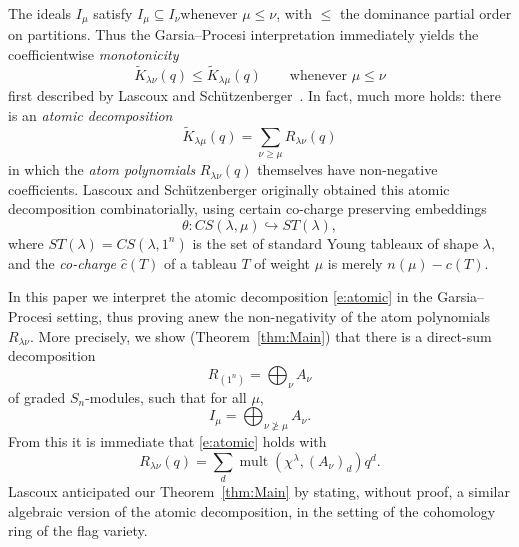 \documentclass[12pt]{article}
\newcommand{\KK}{\tilde{K}}
\newcommand{\charge}{c}
\newcommand{\cocharge}{\hat{c}}
\newcommand{\chg}{\charge}
\newcommand{\ccg}{\cocharge}
\newcommand{\LS}{Lascoux and Sch\"{u}tzenberger}
\newcommand{\mult}{\operatorname{mult}}
\numberwithin{equation}{section}
\theoremstyle{plain}
\theoremstyle{definition}
\theoremstyle{remark}
\begin{document}
The ideals $I_{\mu }$ satisfy
$I_{\mu }\subseteq I_{\nu } %
\text{whenever }\mu \leq \nu$,
with $\leq$ the dominance partial order on partitions.  Thus
the Garsia--Procesi interpretation immediately yields the
coefficientwise {\it monotonicity}
\begin{equation}\label{e:monotonicity}
\KK _{\lambda \nu }(q) \leq \KK _{\lambda \mu }(q) \qquad
\text{whenever }\mu \leq \nu 
\end{equation}
first described by \LS\ \cite{L&S:Plaxique}.
In fact, much more holds: there is an {\it atomic decomposition}
\begin{equation}\label{e:atomic}
\KK _{\lambda \mu }(q) = \sum _{\nu \geq \mu } R_{\lambda \nu }(q)
\end{equation}
in which the {\it atom polynomials} $R_{\lambda \nu }(q)$ themselves
have non-negative coefficients.  Lascoux and Sch\"utzenberger
\cite{L&S:Plaxique,Lascoux} originally obtained this atomic
decomposition combinatorially, using certain co-charge preserving
embeddings
\begin{equation}\label{e:embedding}
\theta \colon CS(\lambda ,\mu )\hookrightarrow ST(\lambda ),
\end{equation}
where $ST(\lambda ) = CS(\lambda ,1^{n})$ is the set of standard
Young tableaux of shape $\lambda $, and the {\it co-charge}
$\ccg(T)$ of a tableau $T$ of weight $\mu$ is merely $n(\mu )-\chg(T)$.  

In this paper we interpret the atomic decomposition \eqref{e:atomic}
in the Garsia--Procesi setting, thus proving anew the non-negativity
of the atom polynomials $R_{\lambda \nu }$.  More precisely, we
show (Theorem~\ref{thm:Main}) that there is a direct-sum decomposition
\begin{equation}\label{e:directsum}
R_{(1^{n})} = \bigoplus_{\nu} A_{\nu }
\end{equation}
of graded $S_{n}$-modules, such that for all $\mu $,
\begin{equation}\label{e:Imusum}
I_{\mu } = \bigoplus_{\nu \not \geq \mu } A_{\nu }.
\end{equation}
From this it is immediate that \eqref{e:atomic} holds with
\begin{equation}\label{e:Rpolinterp}
R_{\lambda \nu }(q) = \sum _{d} \mult (\chi ^{\lambda }, (A_{\nu
})_{d}) q^{d}.
\end{equation}
Lascoux \cite[Thm 6.5]{Lascoux} anticipated our Theorem~\ref{thm:Main}
by stating, without proof, a similar algebraic version of the atomic
decomposition, in the setting of the cohomology ring of the flag
variety.
\end{document}
